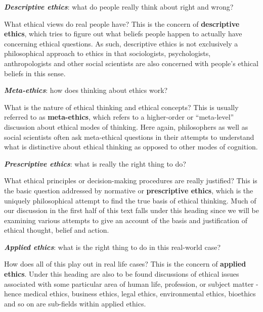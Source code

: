 \documentclass[]{book}
\makeatletter
\newenvironment{kframe}{%
\medskip{}
\setlength{\fboxsep}{.8em}
 \def\at@end@of@kframe{}%
 \ifinner\ifhmode%
  \def\at@end@of@kframe{\end{minipage}}%
  \begin{minipage}{\columnwidth}%
 \fi\fi%
 \def\FrameCommand##1{\hskip\@totalleftmargin \hskip-\fboxsep
 \colorbox{shadecolor}{##1}\hskip-\fboxsep
     \hskip-\linewidth \hskip-\@totalleftmargin \hskip\columnwidth}%
 \MakeFramed {\advance\hsize-\width
   \@totalleftmargin\z@ \linewidth\hsize
   \@setminipage}}%
 {\par\unskip\endMakeFramed%
 \at@end@of@kframe}
\newenvironment{rmdblock}[1]
  {
  \begin{itemize}
  \renewcommand{\labelitemi}{
    \raisebox{-.7\height}[0pt][0pt]{
      {\setkeys{Gin}{width=3em,keepaspectratio}\texttt{[image: img/\#1]}}
    }
  }
  \setlength{\fboxsep}{1em}
  \begin{kframe}
  \item
  }
  {
  \end{kframe}
  \end{itemize}
  }
\newenvironment{rmdnote}
  {\begin{rmdblock}{note}}
  {\end{rmdblock}}
\makeatother
\begin{document}
\textbf{\emph{Descriptive ethics}}: what do people really think about right and wrong?

\begin{rmdnote}
What ethical views do real people have? This is the concern of
\textbf{descriptive ethics}, which tries to figure out what beliefs
people happen to actually have concerning ethical questions. As such,
descriptive ethics is not exclusively a philosophical approach to ethics
in that sociologists, psychologists, anthropologists and other social
scientists are also concerned with people's ethical beliefs in this
sense.
\end{rmdnote}

\textbf{\emph{Meta-ethics}}: how does thinking about ethics work?

\begin{rmdnote}
What is the nature of ethical thinking and ethical concepts? This is
usually referred to as \textbf{meta-ethics}, which refers to a
higher-order or ``meta-level'' discussion about ethical modes of
thinking. Here again, philosophers as well as social scientists often
ask meta-ethical questions in their attempts to understand what is
distinctive about ethical thinking as opposed to other modes of
cognition.
\end{rmdnote}

\textbf{\emph{Prescriptive ethics}}: what is really the right thing to do?

\begin{rmdnote}
What ethical principles or decision-making procedures are really
justified? This is the basic question addressed by normative or
\textbf{prescriptive ethics}, which is the uniquely philosophical
attempt to find the true basis of ethical thinking. Much of our
discussion in the first half of this text falls under this heading since
we will be examining various attempts to give an account of the basis
and justification of ethical thought, belief and action.
\end{rmdnote}

\textbf{\emph{Applied ethics}}: what is the right thing to do in this real-world case?

\begin{rmdnote}
How does all of this play out in real life cases? This is the concern of
\textbf{applied ethics}. Under this heading are also to be found
discussions of ethical issues associated with some particular area of
human life, profession, or subject matter - hence medical ethics,
business ethics, legal ethics, environmental ethics, bioethics and so on
are sub-fields within applied ethics.
\end{rmdnote}
\end{document}
